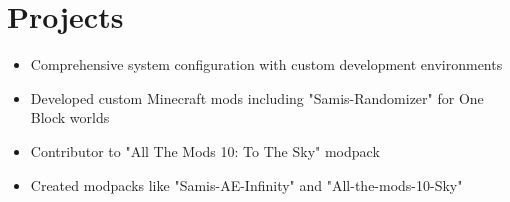\documentclass[letterpaper,10pt]{article}
\begin{document}
\vspace{6pt}

\section{Projects}

\vspace{2pt}
\begin{itemize}[leftmargin=0.35in, itemsep=0pt, topsep=0pt, labelsep=0.035in]
\item Comprehensive system configuration with custom development environments
\end{itemize}
\vspace{4pt}

\vspace{2pt}
\begin{itemize}[leftmargin=0.35in, itemsep=0pt, topsep=0pt, labelsep=0.035in]
\item Developed custom Minecraft mods including "Samis-Randomizer" for One Block worlds
\item Contributor to "All The Mods 10: To The Sky" modpack
\item Created modpacks like "Samis-AE-Infinity" and "All-the-mods-10-Sky"
\end{itemize}
\vspace{4pt}
\end{document}
